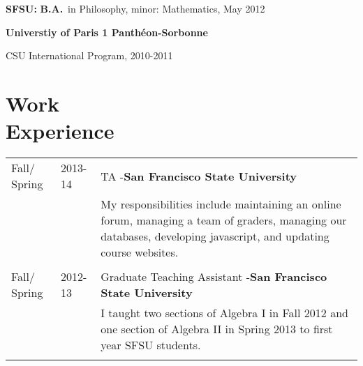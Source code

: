 \documentclass[margin,line,pifont,palatino,courier]{res}
\newenvironment{list1}{
  \begin{list}{\ding{113}}{%
      \setlength{\itemsep}{0in}
      \setlength{\parsep}{0in} \setlength{\parskip}{0in}
      \setlength{\topsep}{0in} \setlength{\partopsep}{0in}
      \setlength{\leftmargin}{0.17in}}}{\end{list}}
\begin{document}
\begin{resume}
\begin{list1}
\item  {\bf SFSU:}  \textbf{B.A.}~in Philosophy, minor:    
Mathematics, May 2012 \\





\item {\bf Universtiy of Paris 1 Panth\'{e}on-Sorbonne}

CSU International Program,  2010-2011\\

%

\end{list1}
 

\section{\sc  Work\\ Experience}

\begin{tabular}{@{}p{0.75in}p{0.5in}p{4in}}
 Fall/ Spring & 2013-14  & TA -{\bf San Francisco State University }  \\	
 					& & 
					My responsibilities include maintaining an online forum, managing
					a team of graders, managing our databases, developing javascript, and updating course websites.   \\ \\

Fall/ Spring & 2012-13  & Graduate Teaching Assistant -{\bf San Francisco State University }  \\
  & 			& 	I taught two sections of Algebra I in Fall 2012  and one section of Algebra II  in Spring 2013 to first year SFSU students.  \\
  		    \\  



%


\end{tabular}
\end{resume}
\end{document}
